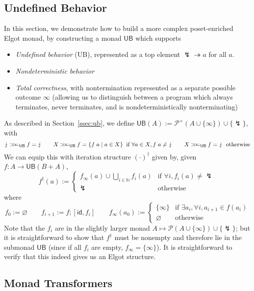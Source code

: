 \documentclass[acmsmall,screen,review]{acmart}
\newcommand{\mc}[1]{\ensuremath{\mathcal{#1}}}
\newcommand{\ms}[1]{\ensuremath{\mathsf{#1}}}
\newcommand{\nats}{\mathbb{N}}
\newcommand{\tref}{\twoheadrightarrow}
\newcommand{\ubeff}{\lightning}
\newcommand{\obind}{\mathbin{>\!\!>\mkern-6.7mu=}}
\newcommand{\mbind}[3]{#2 \obind_{#1} #3}
\begin{document}
\subsection{Undefined Behavior}

\label{apx:ub}

In this section, we demonstrate how to build a more complex poset-enriched Elgot monad, by
constructing a monad $\ms{UB}$ which supports
\begin{itemize}
  \item \emph{Undefined behavior} (UB), represented as a top element $\ubeff \tref a$ for all $a$.
  \item \emph{Nondeterministic behavior}
  \item \emph{Total correctness}, with nontermination represented as a separate possible outcome
  $\infty$ (allowing us to distinguish between a program which always terminates, never terminates,
  and is nondeterministically nonterminating)
\end{itemize}
As described in Section~\ref{ssec:ub}, we define $\ms{UB}(A) := \mc{P}^+(A \cup \{\infty\}) \cup
\{\ubeff\}$, with
$$
\mbind{\ms{UB}}{\ubeff}{f} = \ubeff \qquad
\mbind{\ms{UB}}{X}{f} = \{f\;a \mid a \in X\} \;\; \text{if } \forall a \in X, f\;a \neq \ubeff
\qquad
\mbind{\ms{UB}}{X}{f} = \ubeff \;\; \text{otherwise}
$$
We can equip this with iteration structure $(\cdot)^\dagger$ given by, given $f : A \to \ms{UB}(B +
A)$,
$$
f^\dagger(a) := \begin{cases}
  f_\infty(a) \cup \bigcup_{i \in \nats}f_i(a) & \text{if } \forall i, f_i(a) \neq \ubeff
  \\
  \ubeff & \text{otherwise}
\end{cases}
$$
where
$$
f_0 := \varnothing \qquad
f_{i + 1} := f ; [\ms{id}, f_i] \qquad
f_\infty(a_0) := \begin{cases}
  \{\infty\} & \text{if } \exists a_i, \forall i, a_{i + 1} \in f(a_i)\\
  \varnothing & \text{otherwise}
\end{cases} 
$$
Note that the $f_i$ are in the slightly larger monad $A \mapsto \mc{P}(A \cup \{\infty\}) \cup
\{\ubeff\}$; but it is straightforward to show that $f^\dagger$ must be nonempty and therefore lie
in the submonad $\ms{UB}$ (since if all $f_i$ are empty, $f_\infty = \{\infty\}$). It is
straightforward to verify that this indeed gives us an Elgot structure.

\subsection{Monad Transformers}
\end{document}
